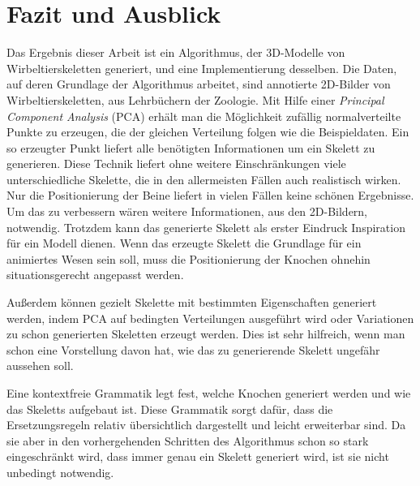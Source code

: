 \chapter{Fazit und Ausblick}
\label{chapter:conclusion}

% 
% 

Das Ergebnis dieser Arbeit ist ein Algorithmus, der 3D-Modelle von Wirbeltierskeletten generiert, und eine Implementierung desselben. Die Daten, auf deren Grundlage der Algorithmus arbeitet, sind annotierte 2D-Bilder von Wirbeltierskeletten, \zb aus Lehrbüchern der Zoologie. 
Mit Hilfe einer \emph{Principal Component Analysis} (PCA) erhält man die Möglichkeit zufällig normalverteilte Punkte zu erzeugen, die der gleichen Verteilung folgen wie die Beispieldaten.
Ein so erzeugter Punkt liefert alle benötigten Informationen um ein Skelett zu generieren.
Diese Technik liefert ohne weitere Einschränkungen viele unterschiedliche Skelette, die in den allermeisten Fällen auch realistisch wirken.\\
Nur die Positionierung der Beine liefert in vielen Fällen keine schönen Ergebnisse. Um das zu verbessern wären weitere Informationen, \zb aus den 2D-Bildern, notwendig. Trotzdem kann das generierte Skelett als erster Eindruck \bzw Inspiration für ein Modell dienen. Wenn das erzeugte Skelett die Grundlage für ein animiertes Wesen sein soll, muss die Positionierung der Knochen ohnehin situationsgerecht angepasst werden.

Außerdem können gezielt Skelette mit bestimmten Eigenschaften generiert werden, indem PCA auf bedingten Verteilungen ausgeführt wird oder Variationen zu schon generierten Skeletten erzeugt werden. Dies ist sehr hilfreich, wenn man schon eine Vorstellung davon hat, wie das zu generierende Skelett ungefähr aussehen soll.

Eine kontextfreie Grammatik legt fest, welche Knochen generiert werden und wie das Skeletts aufgebaut ist.
Diese Grammatik sorgt dafür, dass die Ersetzungsregeln relativ übersichtlich dargestellt und leicht erweiterbar sind. Da sie aber in den vorhergehenden Schritten des Algorithmus schon so stark eingeschränkt wird, dass immer genau ein Skelett generiert wird, ist sie nicht unbedingt notwendig.

